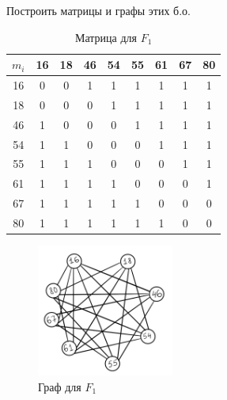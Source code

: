 \documentclass[a4paper, 14pt]{article}
\begin{document}
\begin{problem}
Построить матрицы и графы этих б.о.
	
\end{problem}


\begin{table}[h!]
\centering

\begin{tabular}{|c|c|c|c|c|c|c|c|c|}
    \hline
    $m_i$ & 16 & 18 & 46 & 54 & 55 & 61 & 67 & 80 \\
    \hline
    16 & 0 & 0 & 1 & 1 & 1 & 1 & 1 & 1 \\
    \hline
    18 & 0 & 0 & 0 & 1 & 1 & 1 & 1 & 1 \\
    \hline
    46 & 1 & 0 & 0 & 0 & 1 & 1 & 1 & 1 \\
    \hline
    54 & 1 & 1 & 0 & 0 & 0 & 1 & 1 & 1 \\
    \hline
    55 & 1 & 1 & 1 & 0 & 0 & 0 & 1 & 1 \\
    \hline
    61 & 1 & 1 & 1 & 1 & 0 & 0 & 0 & 1 \\
    \hline
    67 & 1 & 1 & 1 & 1 & 1 & 0 & 0 & 0 \\
    \hline
    80 & 1 & 1 & 1 & 1 & 1 & 1 & 0 & 0 \\
    \hline
\end{tabular}
\caption{Матрица для $F_1$}
\label{Матрица:1}


\end{table}

\begin{figure}
    \centering
    \includegraphics[width=0.4\textwidth]{graph1.png}
    \caption{Граф для $F_1$}
    \label{Рисунок:1}
\end{figure}
\end{document}
